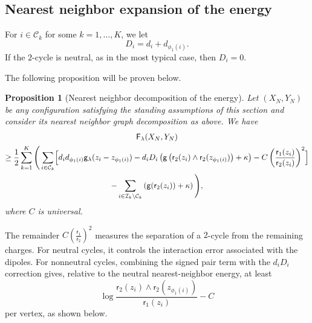 \documentclass[a4paper,10pt,leqno]{amsart}
\numberwithin{equation}{section}
\newtheorem{prop}{Proposition}[section]
\def\hal{\frac{1}{2}}
\def\g{\mathsf{g}}
\def\F{\mathsf{F}}
\def\rr{\mathsf{r}}
\begin{document}
\subsection{Nearest neighbor expansion of the energy}
For $i\in \mathcal C_k$ for some $k=1, \dots, K$, we let
\begin{equation*} D_i= d_i + d_{\phi_1(i)} .\end{equation*}
If the $2$-cycle is neutral, as in the most typical case, then $D_i=0$.

The following proposition will be proven below.
\begin{prop}[Nearest neighbor decomposition of the energy]\label{prop:mino2}
  Let $(X_N, Y_N)$ be any configuration satisfying the standing assumptions of this section and consider its nearest neighbor graph decomposition as above. We have
  \begin{multline}
    \label{minoF02}
    \F_\lambda(X_N,Y_N) \\
    \ge \hal \sum_{k=1}^K \Bigg( \sum_{i\in \mathcal C_k} \Bigl[d_i d_{\phi_1(i)} \g_\lambda(z_i-z_{\phi_1(i)} ) -d_i D_i\left( \g\left( \rr_2(z_i) \wedge \rr_2(z_{\phi_1(i)} ) \right)+\kappa\right) -C \left( \frac{\rr_1(z_i)}{\rr_2(z_i)}\right)^2\Bigr]
    \\-\sum_{i\in \mathcal{I}_k \backslash \mathcal C_k} \left(\g(\rr_2(z_i)) +\kappa \right)\Bigg),
  \end{multline}
  where $C$ is universal.
\end{prop}
The remainder $C(\frac{\rr_1}{\rr_2})^2$ measures the separation of a $2$-cycle from the remaining charges. For neutral cycles, it controls the interaction error associated with the dipoles.
For nonneutral cycles, combining the signed pair term with the $d_iD_i$ correction gives, relative to the neutral nearest-neighbor energy, at least
\[
  \log\frac{\rr_2(z_i)\wedge\rr_2(z_{\phi_1(i)})}{\rr_1(z_i)}-C
\]
per vertex, as shown below.
\end{document}
